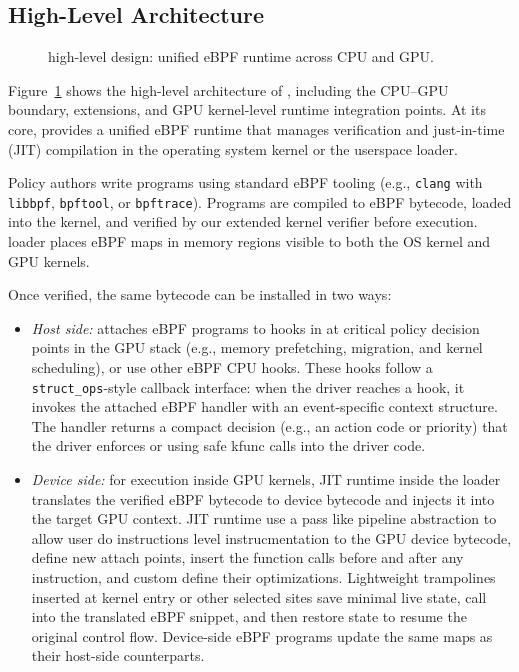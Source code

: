 \subsection{High-Level Architecture}
\label{sec:arch}

\begin{figure}
\centering
{}
\vspace{-.5ex}
\caption{\sys high-level design: unified eBPF runtime across CPU and GPU.}
\label{fig:system-design}
\end{figure}

Figure~\ref{fig:system-design} shows the high-level architecture of \sys, including the CPU--GPU boundary, \sysdriver extensions, and GPU kernel-level runtime integration points. At its core, \sys provides a unified eBPF runtime that manages verification and just-in-time (JIT) compilation in the operating system kernel or the userspace loader.

Policy authors write \sys programs using standard eBPF tooling (e.g., \texttt{clang} with \texttt{libbpf}, \texttt{bpftool}, or \texttt{bpftrace}). Programs are compiled to eBPF bytecode, loaded into the kernel, and verified by our extended kernel verifier before execution. \sys loader places eBPF maps in memory regions visible to both the OS kernel and GPU kernels.

Once verified, the same bytecode can be installed in two ways:

\begin{itemize}[leftmargin=*]
  \item \emph{Host side:} \sys attaches eBPF programs to hooks in \sysdriver at critical policy decision points in the GPU stack (e.g., memory prefetching, migration, and kernel scheduling), or use other eBPF CPU hooks. These hooks follow a \texttt{struct\_ops}-style callback interface: when the driver reaches a hook, it invokes the attached eBPF handler with an event-specific context structure. The handler returns a compact decision (e.g., an action code or priority) that the driver enforces or using safe kfunc calls into the driver code.
  \item \emph{Device side:} for execution inside GPU kernels, \sys JIT runtime inside the loader translates the verified eBPF bytecode to device bytecode and injects it into the target GPU context. JIT runtime use a pass like pipeline abstraction to allow user do instructions level instrucmentation to the GPU device bytecode, define new attach points, insert the function calls before and after any instruction, and custom define their optimizations. Lightweight trampolines inserted at kernel entry or other selected sites save minimal live state, call into the translated eBPF snippet, and then restore state to resume the original control flow. Device-side eBPF programs update the same maps as their host-side counterparts.
\end{itemize}

